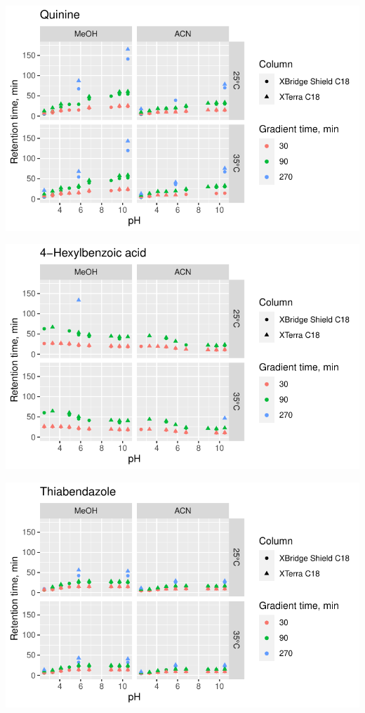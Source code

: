 \documentclass[
  letterpaper,
  DIV=11,
  numbers=noendperiod]{scrreprt}
\begin{document}
\includegraphics{index_files/figure-pdf/unnamed-chunk-4-129.pdf}

\includegraphics{index_files/figure-pdf/unnamed-chunk-4-130.pdf}

\includegraphics{index_files/figure-pdf/unnamed-chunk-4-131.pdf}
\end{document}

